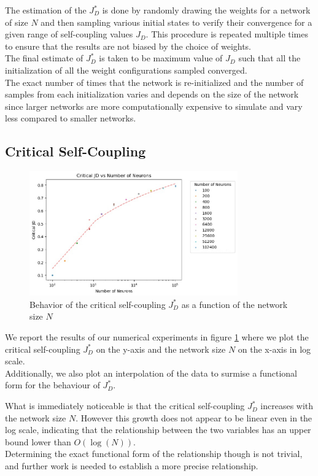 \documentclass[a4paper,12pt]{report}
\begin{document}
The estimation of the $J^*_D$ is done by randomly drawing the weights for a network of
size $N$ and then sampling various initial states to verify their convergence for a given
range of self-coupling values $J_D$. This procedure is repeated multiple times to ensure that 
the results are not biased by the choice of weights. \\
The final estimate of $J^*_D$ is taken to be maximum value of $J_D$ such that all the 
initialization of all the weight configurations sampled converged.\\
The exact number of times that the network is re-initialized and the number of samples
from each initialization varies and depends on the size of the network since larger
networks are more computationally expensive to simulate and vary less compared to smaller
networks.

\subsection*{Critical Self-Coupling}

\begin{figure}[h!]
  \centering
  \includegraphics[width=0.8\textwidth]{pictures/Critical_JD_vs_Neurons.jpg}
  \caption{Behavior of the critical self-coupling $J^*_D$ as a function of the 
  network size $N$}
  \label{fig:critical_JD_vs_Neurons}
\end{figure}

We report the results of our numerical experiments in figure 
\ref{fig:critical_JD_vs_Neurons} where we plot the critical self-coupling
$J^*_D$ on the y-axis and the network size $N$ on the x-axis in log scale. \\
Additionally, we also plot an interpolation of the data to surmise a functional form
for the behaviour of $J^*_D$.

What is immediately noticeable is that the critical self-coupling $J^*_D$ increases 
with the network size $N$. However this growth does not appear to be linear even in 
the log scale, indicating that the relationship between the two variables has an upper
bound lower than $O\left(\log\left(N\right)\right)$.\\
Determining the exact functional form of the relationship though is not trivial, and 
further work is needed to establish a more precise relationship.
\end{document}
